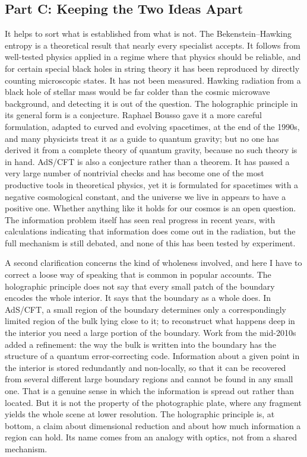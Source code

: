 \subsection*{Part C: Keeping the Two Ideas Apart}

It helps to sort what is established from what is not.
The Bekenstein--Hawking entropy is a theoretical result that nearly every specialist accepts.
It follows from well-tested physics applied in a regime where that physics should be reliable, and for certain special black holes in string theory it has been reproduced by directly counting microscopic states.
It has not been measured.
Hawking radiation from a black hole of stellar mass would be far colder than the cosmic microwave background, and detecting it is out of the question.
The holographic principle in its general form is a conjecture.
Raphael Bousso gave it a more careful formulation, adapted to curved and evolving spacetimes, at the end of the 1990s, and many physicists treat it as a guide to quantum gravity; but no one has derived it from a complete theory of quantum gravity, because no such theory is in hand.
AdS/CFT is also a conjecture rather than a theorem.
It has passed a very large number of nontrivial checks and has become one of the most productive tools in theoretical physics, yet it is formulated for spacetimes with a negative cosmological constant, and the universe we live in appears to have a positive one.
Whether anything like it holds for our cosmos is an open question.
The information problem itself has seen real progress in recent years, with calculations indicating that information does come out in the radiation, but the full mechanism is still debated, and none of this has been tested by experiment.

A second clarification concerns the kind of wholeness involved, and here I have to correct a loose way of speaking that is common in popular accounts.
The holographic principle does not say that every small patch of the boundary encodes the whole interior.
It says that the boundary as a whole does.
In AdS/CFT, a small region of the boundary determines only a correspondingly limited region of the bulk lying close to it; to reconstruct what happens deep in the interior you need a large portion of the boundary.
Work from the mid-2010s added a refinement: the way the bulk is written into the boundary has the structure of a quantum error-correcting code.
Information about a given point in the interior is stored redundantly and non-locally, so that it can be recovered from several different large boundary regions and cannot be found in any small one.
That is a genuine sense in which the information is spread out rather than located.
But it is not the property of the photographic plate, where any fragment yields the whole scene at lower resolution.
The holographic principle is, at bottom, a claim about dimensional reduction and about how much information a region can hold.
Its name comes from an analogy with optics, not from a shared mechanism.

